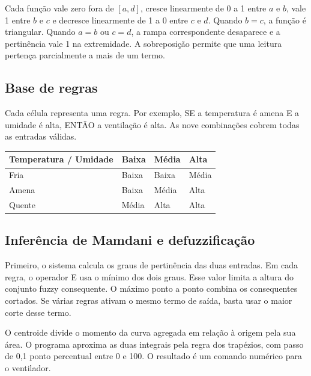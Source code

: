 \documentclass[12pt,a4paper]{article}
\begin{document}
Cada função vale zero fora de $[a, d]$, cresce linearmente de 0 a 1 entre $a$ e $b$, vale 1 entre $b$ e $c$ e decresce linearmente de 1 a 0 entre $c$ e $d$. Quando $b = c$, a função é triangular. Quando $a = b$ ou $c = d$, a rampa correspondente desaparece e a pertinência vale 1 na extremidade. A sobreposição permite que uma leitura pertença parcialmente a mais de um termo.

\subsection{Base de regras}

Cada célula representa uma regra. Por exemplo, SE a temperatura é amena E a umidade é alta, ENTÃO a ventilação é alta. As nove combinações cobrem todas as entradas válidas.

\begin{table}[htbp]
    \centering
    \begin{tabular}{>{\raggedright\arraybackslash}p{4.8cm} >{\raggedright\arraybackslash}p{2.2cm} >{\raggedright\arraybackslash}p{2.2cm} >{\raggedright\arraybackslash}p{2.2cm}}
        \toprule
        \textbf{Temperatura / Umidade} & \textbf{Baixa} & \textbf{Média} & \textbf{Alta} \\
        \midrule
        Fria & Baixa & Baixa & Média \\
        \addlinespace
        Amena & Baixa & Média & Alta \\
        \addlinespace
        Quente & Média & Alta & Alta \\
        \bottomrule
    \end{tabular}
\end{table}

\subsection{Inferência de Mamdani e defuzzificação}

Primeiro, o sistema calcula os graus de pertinência das duas entradas. Em cada regra, o operador E usa o mínimo dos dois graus. Esse valor limita a altura do conjunto fuzzy consequente. O máximo ponto a ponto combina os consequentes cortados. Se várias regras ativam o mesmo termo de saída, basta usar o maior corte desse termo.

O centroide divide o momento da curva agregada em relação à origem pela sua área. O programa aproxima as duas integrais pela regra dos trapézios, com passo de 0,1 ponto percentual entre 0 e 100. O resultado é um comando numérico para o ventilador.
\end{document}
